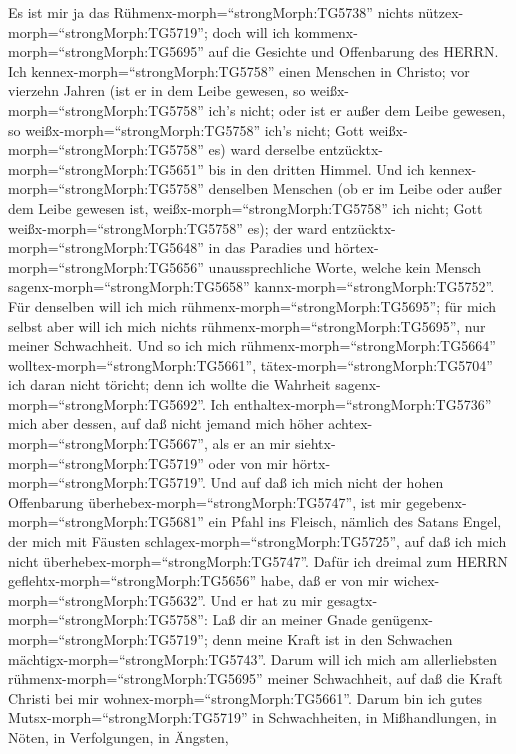 Es ist mir ja das Rühmenx-morph=``strongMorph:TG5738''
nichts nützex-morph=``strongMorph:TG5719''; doch will ich
kommenx-morph=``strongMorph:TG5695'' auf die Gesichte und Offenbarung
des HERRN.  Ich kennex-morph=``strongMorph:TG5758'' einen
Menschen in Christo; vor vierzehn Jahren (ist er in dem Leibe gewesen,
so weißx-morph=``strongMorph:TG5758'' ich's nicht; oder ist er außer dem
Leibe gewesen, so weißx-morph=``strongMorph:TG5758'' ich's nicht; Gott
weißx-morph=``strongMorph:TG5758'' es) ward derselbe
entzücktx-morph=``strongMorph:TG5651'' bis in den dritten Himmel.
 Und ich kennex-morph=``strongMorph:TG5758'' denselben
Menschen (ob er im Leibe oder außer dem Leibe gewesen ist,
weißx-morph=``strongMorph:TG5758'' ich nicht; Gott
weißx-morph=``strongMorph:TG5758'' es);  der ward
entzücktx-morph=``strongMorph:TG5648'' in das Paradies und
hörtex-morph=``strongMorph:TG5656'' unaussprechliche Worte, welche kein
Mensch sagenx-morph=``strongMorph:TG5658''
kannx-morph=``strongMorph:TG5752''.  Für denselben will ich
mich rühmenx-morph=``strongMorph:TG5695''; für mich selbst aber will ich
mich nichts rühmenx-morph=``strongMorph:TG5695'', nur meiner
Schwachheit.  Und so ich mich
rühmenx-morph=``strongMorph:TG5664''
wolltex-morph=``strongMorph:TG5661'', tätex-morph=``strongMorph:TG5704''
ich daran nicht töricht; denn ich wollte die Wahrheit
sagenx-morph=``strongMorph:TG5692''. Ich
enthaltex-morph=``strongMorph:TG5736'' mich aber dessen, auf daß nicht
jemand mich höher achtex-morph=``strongMorph:TG5667'', als er an mir
siehtx-morph=``strongMorph:TG5719'' oder von mir
hörtx-morph=``strongMorph:TG5719''.  Und auf daß ich mich
nicht der hohen Offenbarung überhebex-morph=``strongMorph:TG5747'', ist
mir gegebenx-morph=``strongMorph:TG5681'' ein Pfahl ins Fleisch, nämlich
des Satans Engel, der mich mit Fäusten
schlagex-morph=``strongMorph:TG5725'', auf daß ich mich nicht
überhebex-morph=``strongMorph:TG5747''.  Dafür ich dreimal
zum HERRN geflehtx-morph=``strongMorph:TG5656'' habe, daß er von mir
wichex-morph=``strongMorph:TG5632''.  Und er hat zu mir
gesagtx-morph=``strongMorph:TG5758'': Laß dir an meiner Gnade
genügenx-morph=``strongMorph:TG5719''; denn meine Kraft ist in den
Schwachen mächtigx-morph=``strongMorph:TG5743''. Darum will ich mich am
allerliebsten rühmenx-morph=``strongMorph:TG5695'' meiner Schwachheit,
auf daß die Kraft Christi bei mir wohnex-morph=``strongMorph:TG5661''.
 Darum bin ich gutes Mutsx-morph=``strongMorph:TG5719'' in
Schwachheiten, in Mißhandlungen, in Nöten, in Verfolgungen, in Ängsten,
